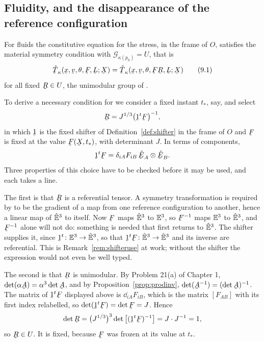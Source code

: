 \subsection*{Fluidity, and the disappearance of the reference
configuration}

For fluids the constitutive equation  for the stress, in the
frame of $O$, satisfies the material symmetry condition  with
$\mathcal{G}_{\kappa(p_{0})}=U$, that is
\begin{equation}
   \hat\bT_{\kappa}(\bx,\bv,\theta,\bF,\bL;\bX)
   =\hat\bT_{\kappa}(\bx,\bv,\theta,\bF\bR,\bL;\bX)
   \tag{9.1}\label{eq:9.1}
\end{equation}
for all fixed $\bR\in U$, the unimodular group of .

To derive a necessary condition for  we consider a fixed
instant $t_{*}$, say, and select
\[
   \bR=J^{1/3}\big(\shift^{t}\bF\big)^{-1},
\]
in which $\shift$ is the fixed shifter of Definition~\ref{def:shifter}
in the frame of $O$ and $\bF$ is fixed at the value $\bF(\bX,t_{*})$,
with determinant $J$. In terms of components,
\[
   \shift^{t}\bF=\dd_{iA}F_{iB}\,\hbE_{A}\otimes\hbE_{B}.
\]
Three properties of this choice have to be checked before it may be
used, and each takes a line.

The first is that $\bR$ is a referential tensor. A symmetry
transformation is required by  to be the gradient of a map
from one reference configuration to another, hence a linear map of
$\hat{\mathbb{E}}^{3}$ to itself. Now $\bF$ maps $\hat{\mathbb{E}}^{3}$ to $\mathbb{E}^{3}$, so $\bF^{-1}$ maps
$\mathbb{E}^{3}$ to $\hat{\mathbb{E}}^{3}$, and $\bF^{-1}$ alone will not do: something is needed
that first returns to $\hat{\mathbb{E}}^{3}$. The shifter supplies it, since
$\shift^{t}\colon\Vt\to\hVt$, so that $\shift^{t}\bF\colon\hVt\to\hVt$
and its inverse are referential. This is Remark~\ref{rem:shifteruse} at
work; without the shifter the expression would not even be well typed.

The second is that $\bR$ is unimodular. By Problem 21(a) of Chapter 1,
$\det(\alpha\bA)=\alpha^{3}\det\bA$, and by
Proposition~\ref{prop:prodinv}, $\det(\bA^{-1})=(\det\bA)^{-1}$. The
matrix of $\shift^{t}\bF$ displayed above is $\dd_{iA}F_{iB}$, which is
the matrix $[F_{AB}]$ with its first index relabelled, so
$\det(\shift^{t}\bF)=\det\bF=J$. Hence
\[
   \det\bR=\big(J^{1/3}\big)^{3}\det\big[(\shift^{t}\bF)^{-1}\big]
   =J\cdot J^{-1}=1 ,
\]
so $\bR\in U$. It is fixed, because $\bF$ was frozen at its value at
$t_{*}$.

